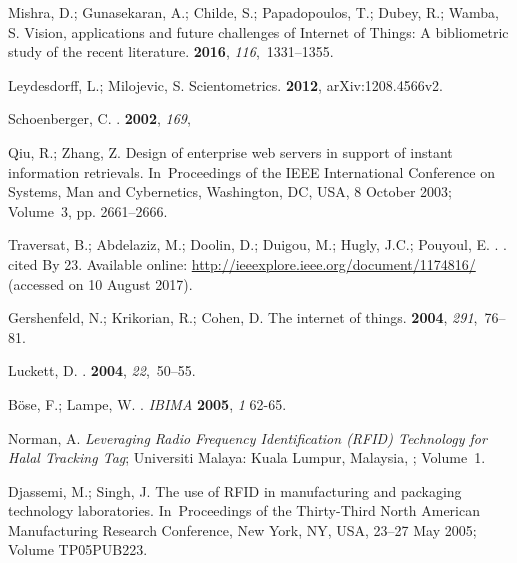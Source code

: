 \documentclass[symmetry,article,accept,moreauthors,pdftex10pt,a4paper]{mdpi}
\begin{document}
\begin{thebibliography}{999}
Mishra, D.; Gunasekaran, A.; Childe, S.; Papadopoulos, T.; Dubey, R.; Wamba, S.
\newblock Vision, applications and future challenges of Internet of Things: A
bibliometric study of the recent literature.
 {\bf 2016}, {\em
	116},~1331--1355.

Leydesdorff, L.; Milojevic, S.
\newblock Scientometrics.
 {\bf 2012},  arXiv:1208.4566v2.

Schoenberger, C.
.
 {\bf {2002}}, {\em {169}},

Qiu, R.; Zhang, Z.
\newblock Design of enterprise web servers in support of instant information
retrievals.
\newblock In~Proceedings of the IEEE International Conference on Systems, Man and Cybernetics, Washington, DC, USA, 8 October 2003; Volume~3, pp. 2661--2666.

Traversat, B.; Abdelaziz, M.; Doolin, D.; Duigou, M.; Hugly, J.C.; Pouyoul, E.
.
.
\newblock cited By 23. Available online: \url{http://ieeexplore.ieee.org/document/1174816/} (accessed on 10 August 2017). 

Gershenfeld, N.; Krikorian, R.; Cohen, D.
\newblock The internet of things.
 {\bf 2004}, {\em 291},~76--81.

Luckett, D.
.
 {\bf {2004}}, {\em {22}},~{50--55}.

Böse, F.; Lampe, W.
.
\newblock \emph{IBIMA} \textbf{2005}, \emph{1} 62-65.

Norman, A.
\newblock \emph{Leveraging Radio Frequency Identification (RFID) Technology for Halal
	Tracking Tag}; Universiti Malaya: Kuala Lumpur, Malaysia,
; Volume~1.

Djassemi, M.; Singh, J.
\newblock The use of RFID in manufacturing and packaging technology
laboratories. In~Proceedings of the Thirty-Third North American Manufacturing Research Conference,
\newblock New York, NY, USA, 23--27 May 2005; Volume TP05PUB223.


\end{thebibliography}
\end{document}
